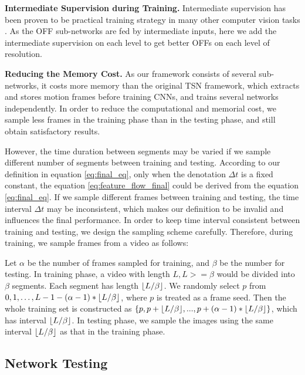 \documentclass[10pt,twocolumn,letterpaper]{article}
\DeclarePairedDelimiter\floor{\lfloor}{\rfloor}
\begin{document}
\textbf{Intermediate Supervision during Training.} Intermediate supervision has been proven to be practical training strategy in many other computer vision tasks \cite{newell2016hourglass, wei2016cpm, Yangwei_2017_ICCV, Ouyang_2017_ICCV,Chu_2017_CVPR}. As the OFF sub-networks are fed by intermediate inputs, here we add the intermediate supervision on each level to get better OFFs on each level of resolution.







\textbf{Reducing the Memory Cost.} 
As our framework consists of several sub-networks, it costs more memory than the original TSN framework, which extracts and stores motion frames before training CNNs, and trains several networks independently. In order to reduce the computational and memorial cost, we sample less frames in the training phase than in the testing phase, and still obtain satisfactory results. 


However, the time duration between segments may be varied if we sample different number of segments between training and testing. According to our definition in equation \ref{eq:final_eq}, only when the denotation $\Delta t$ is a fixed constant, the equation \ref{eq:feature_flow_final} could be derived from the equation \ref{eq:final_eq}. If we sample different frames between training and testing, the time interval $\Delta t$ may be inconsistent, which makes our definition to be invalid and influences the final performance. In order to keep time interval consistent between training and testing, we design the sampling scheme carefully. Therefore, during training, we sample frames from a video as follows:

Let $\alpha$ be the number of frames sampled for training, and $\beta$ be the number for testing. In training phase, a video with length $L, L>=\beta$ would be divided into $\beta$ segments. Each segment has length $\floor*{L / \beta}$. We randomly select $p$ from ${0, 1, \ldots, L - 1 - (\alpha-1) * \floor*{L / \beta}}$, where $p$ is treated as a frame seed. Then the whole training set is constructed as $\{p, p + \floor*{L / \beta}, ..., p + (\alpha - 1) * \floor*{L / \beta}\}$, which has interval $\floor*{L / \beta}$. In testing phase,  we sample the images using the same interval $\floor*{L / \beta}$ as that in the training phase.

\subsection{Network Testing}
\end{document}
